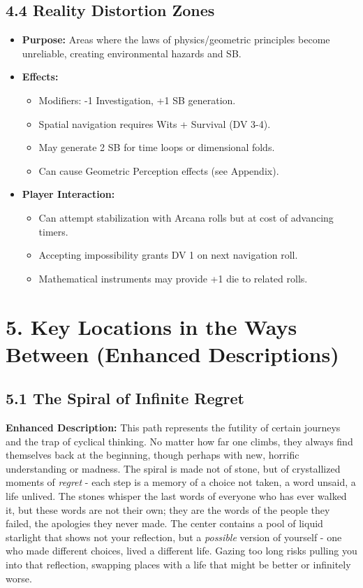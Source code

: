 \documentclass[11pt]{article}
\begin{document}
\subsection*{4.4 Reality Distortion Zones}

\begin{itemize}
\item \textbf{Purpose:} Areas where the laws of physics/geometric principles become unreliable, creating environmental hazards and SB.
\item \textbf{Effects:}
\begin{itemize}
\item Modifiers: -1 Investigation, +1 SB generation.
\item Spatial navigation requires Wits + Survival (DV 3-4).
\item May generate 2 SB for time loops or dimensional folds.
\item Can cause Geometric Perception effects (see Appendix).
\end{itemize}
\item \textbf{Player Interaction:}
\begin{itemize}
\item Can attempt stabilization with Arcana rolls but at cost of advancing timers.
\item Accepting impossibility grants DV 1 on next navigation roll.
\item Mathematical instruments may provide +1 die to related rolls.
\end{itemize}
\end{itemize}

\clearpage

\section*{5. Key Locations in the Ways Between (Enhanced Descriptions)}

\subsection*{5.1 The Spiral of Infinite Regret}

\textbf{Enhanced Description:} This path represents the futility of certain journeys and the trap of cyclical thinking. No matter how far one climbs, they always find themselves back at the beginning, though perhaps with new, horrific understanding or madness. The spiral is made not of stone, but of crystallized moments of \textit{regret} - each step is a memory of a choice not taken, a word unsaid, a life unlived. The stones whisper the last words of everyone who has ever walked it, but these words are not their own; they are the words of the people they failed, the apologies they never made. The center contains a pool of liquid starlight that shows not your reflection, but a \textit{possible} version of yourself - one who made different choices, lived a different life. Gazing too long risks pulling you into that reflection, swapping places with a life that might be better or infinitely worse.
\end{document}
